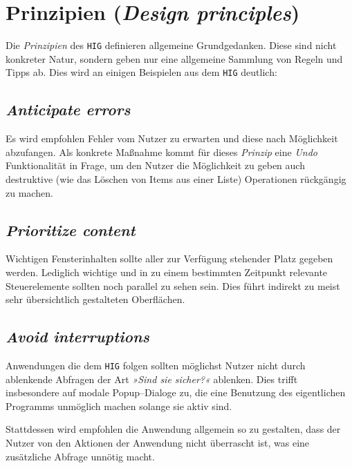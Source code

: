 \documentclass[11pt,ngerman,toc=listof,index=totoc]{scrreprt}
\begin{document}
\section{\texorpdfstring{Prinzipien (\emph{Design
principles})}{Prinzipien (Design principles)}}\label{prinzipien-design-principles}

Die \emph{Prinzipien} des \texttt{HIG} definieren allgemeine
Grundgedanken. Diese sind nicht konkreter Natur, sondern geben nur eine
allgemeine Sammlung von Regeln und Tipps ab. Dies wird an einigen
Beispielen aus dem \texttt{HIG} deutlich:

\subsection{\texorpdfstring{\emph{Anticipate
errors}}{Anticipate errors}}\label{anticipate-errors}

Es wird empfohlen Fehler vom Nutzer zu erwarten und diese nach
Möglichkeit abzufangen. Als konkrete Maßnahme kommt für dieses
\emph{Prinzip} eine \emph{Undo} Funktionalität in Frage, um den Nutzer
die Möglichkeit zu geben auch destruktive (wie das Löschen von Items aus
einer Liste) Operationen rückgängig zu machen.

\subsection{\texorpdfstring{\emph{Prioritize
content}}{Prioritize content}}\label{prioritize-content}

Wichtigen Fensterinhalten sollte aller zur Verfügung stehender Platz
gegeben werden. Lediglich wichtige und in zu einem bestimmten Zeitpunkt
relevante Steuerelemente sollten noch parallel zu sehen sein. Dies führt
indirekt zu meist sehr übersichtlich gestalteten Oberflächen.

\subsection{\texorpdfstring{\emph{Avoid
interruptions}}{Avoid interruptions}}\label{avoid-interruptions}

Anwendungen die dem \texttt{HIG} folgen sollten möglichst Nutzer nicht
durch ablenkende Abfragen der Art \emph{»Sind sie sicher?«} ablenken.
Dies trifft insbesondere auf modale Popup--Dialoge zu, die eine
Benutzung des eigentlichen Programms unmöglich machen solange sie aktiv
sind.

Stattdessen wird empfohlen die Anwendung allgemein so zu gestalten, dass
der Nutzer von den Aktionen der Anwendung nicht überrascht ist, was eine
zusätzliche Abfrage unnötig macht.
\end{document}
